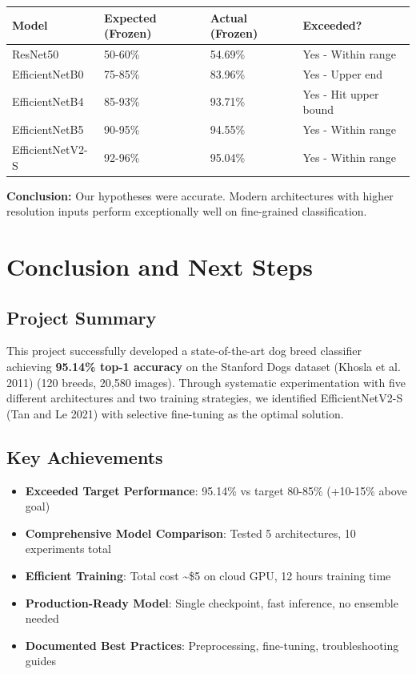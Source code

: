 \documentclass[
  letterpaper,
  DIV=11,
  numbers=noendperiod]{scrartcl}
\providecommand{\tightlist}{%
  \setlength{\itemsep}{0pt}\setlength{\parskip}{0pt}}
\begin{document}
\begin{longtable}[]{@{}llll@{}}
\toprule\noalign{}
Model & Expected (Frozen) & Actual (Frozen) & Exceeded? \\
\midrule\noalign{}
\endhead
\bottomrule\noalign{}
\endlastfoot
ResNet50 & 50-60\% & 54.69\% & Yes - Within range \\
EfficientNetB0 & 75-85\% & 83.96\% & Yes - Upper end \\
EfficientNetB4 & 85-93\% & 93.71\% & Yes - Hit upper bound \\
EfficientNetB5 & 90-95\% & 94.55\% & Yes - Within range \\
EfficientNetV2-S & 92-96\% & 95.04\% & Yes - Within range \\
\end{longtable}

\textbf{Conclusion:} Our hypotheses were accurate. Modern architectures
with higher resolution inputs perform exceptionally well on fine-grained
classification.

\section{Conclusion and Next Steps}\label{conclusion-and-next-steps}

\subsection{Project Summary}\label{project-summary}

This project successfully developed a state-of-the-art dog breed
classifier achieving \textbf{95.14\% top-1 accuracy} on the Stanford
Dogs dataset (Khosla et al. 2011) (120 breeds, 20,580 images). Through
systematic experimentation with five different architectures and two
training strategies, we identified EfficientNetV2-S (Tan and Le 2021)
with selective fine-tuning as the optimal solution.

\subsection{Key Achievements}\label{key-achievements}

\begin{itemize}
\tightlist
\item
  \textbf{Exceeded Target Performance}: 95.14\% vs target 80-85\%
  (+10-15\% above goal)\\
\item
  \textbf{Comprehensive Model Comparison}: Tested 5 architectures, 10
  experiments total\\
\item
  \textbf{Efficient Training}: Total cost \textasciitilde\$5 on cloud
  GPU, 12 hours training time\\
\item
  \textbf{Production-Ready Model}: Single checkpoint, fast inference, no
  ensemble needed\\
\item
  \textbf{Documented Best Practices}: Preprocessing, fine-tuning,
  troubleshooting guides
\end{itemize}
\end{document}
